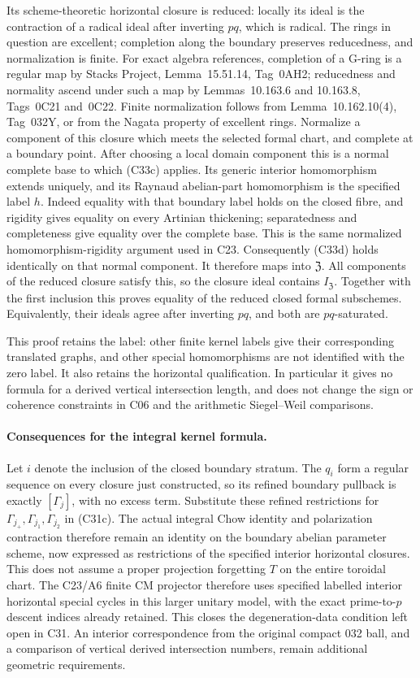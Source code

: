 \documentclass[11pt]{article}
\theoremstyle{definition}\newtheorem{definition}[theorem]{Definition}\newtheorem{remark}[theorem]{Remark}
\begin{document}
Its scheme-theoretic horizontal closure
is reduced: locally its ideal is the
contraction of a radical ideal after
inverting $pq$, which is radical.
The rings in question are excellent;
completion along the boundary preserves
reducedness, and normalization is finite.
For exact algebra references, completion
of a G-ring is a regular map by Stacks
Project, Lemma~15.51.14, Tag~0AH2;
reducedness and normality ascend under
such a map by Lemmas~10.163.6 and
10.163.8, Tags~0C21 and~0C22.
Finite normalization follows from
Lemma~10.162.10(4), Tag~032Y, or from
the Nagata property of excellent rings.
Normalize a component of this closure
which meets the selected formal chart,
and complete at a boundary point. After
choosing a local domain component this
is a normal complete base to which
(C33c) applies. Its generic interior
homomorphism extends uniquely, and its
Raynaud abelian-part homomorphism is the
specified label $h$. Indeed equality
with that boundary label holds on the
closed fibre, and rigidity gives equality
on every Artinian thickening; separatedness
and completeness give equality over the
complete base. This is the same
normalized homomorphism-rigidity argument
used in C23. Consequently (C33d)
holds identically on that normal component.
It therefore maps into $\mathfrak Z$.
All components of the reduced closure
satisfy this, so the closure ideal contains
$I_{\mathfrak Z}$. Together with the first
inclusion this proves equality of the
reduced closed formal subschemes. Equivalently,
their ideals agree after inverting $pq$,
and both are $pq$-saturated.

This proof retains the label: other finite
kernel labels give their corresponding
translated graphs, and other special
homomorphisms are not identified with the
zero label. It also retains the horizontal
qualification. In particular it gives no
formula for a derived vertical intersection
length, and does not change the sign or
coherence constraints in C06 and the
arithmetic Siegel--Weil comparisons.

\paragraph{Consequences for the integral kernel formula.}
Let $i$ denote the inclusion of the
closed boundary stratum. The $q_i$
form a regular sequence on every
closure just constructed, so its
refined boundary pullback is exactly
$[\Gamma_j]$, with no excess term.
Substitute these refined restrictions
for $\Gamma_{j_+},\Gamma_{j_1},\Gamma_{j_2}$
in (C31c). The actual integral Chow
identity and polarization contraction
therefore remain an identity on the
boundary abelian parameter scheme,
now expressed as restrictions of the
specified interior horizontal closures.
This does not assume a proper projection
forgetting $T$ on the entire toroidal
chart. The C23/A6 finite CM
projector therefore uses specified
labelled interior horizontal special
cycles in this larger unitary model,
with the exact prime-to-$p$ descent
indices already retained. This closes
the degeneration-data condition left
open in C31. An interior correspondence
from the original compact 032 ball,
and a comparison of vertical derived
intersection numbers, remain additional
geometric requirements.
\end{document}

